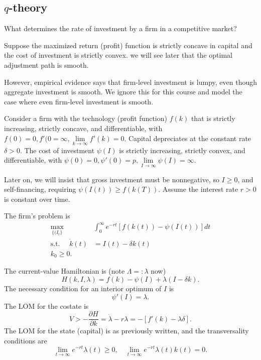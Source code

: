 \documentclass{tufte-handout}
\theoremstyle{definition}
\begin{document}
\subsection{$q$-theory}
What determines the rate of investment by a firm in a competitive market? 

Suppose the maximized return (profit) function is strictly concave in capital and the cost of investment is strictly convex. we will see later that the optimal adjustment path is smooth.

However, empirical evidence says that firm-level investment is lumpy, even though aggregate investment is smooth. We ignore this for this course and model the case where even firm-level investment is smooth.

Consider a firm with the technology (profit function) $f(k)$ that is strictly increasing, strictly concave, and differentiable, with $f(0) = 0, f'(0 = \infty, \lim\limits_{k \to \infty} f'(k) = 0$. Capital depreciates at the constant rate $\delta > 0$. The cost of investment $\psi(I)$ is strictly increasing, strictly convex, and differentiable, with $\psi(0) = 0, \psi'(0) = p, \lim\limits_{I \to \infty} \psi(I) = \infty$.

Later on, we will insist that gross investment must be nonnegative, so $I \ge 0$, and self-financing, requiring $\psi(I(t)) \ge f(k(T))$. Assume the interest rate $r > 0$ is constant over time.

The firm's problem is
\begin{align*}
	\max_{\{(I_t\}} &\int_{0}^{\infty} e^{-rt} \left[ f(k(t)) - \psi(I(t)) \right] dt \\
	\text{s.t. } \quad \dot{k}(t) &= I(t) - \delta k(t) \\
	k_0 \ge 0
.\end{align*}

The current-value Hamiltonian is (note $\Lambda =: \lambda$ now) \[
	H(k,I,\lambda) = f(k) - \psi(I) + \lambda(I - \delta k)
	.\]
The necessary condition for an interior optimum of $I$ is \[\psi'(I) = \lambda.\] The LOM for the costate is \[
	V>	- \frac{\partial H}{\partial k} = \dot{\lambda} - r\lambda = -\left[ f'(k) - \lambda\delta \right] 
.\] The LOM for the state (capital) is as previously written, and the transversality conditions are \[
	\lim\limits_{t \to \infty} e^{-rt}\lambda(t) \ge 0, \quad \lim\limits_{t \to \infty} e^{-rt}\lambda(t) k(t) = 0
.\] 
\end{document}
